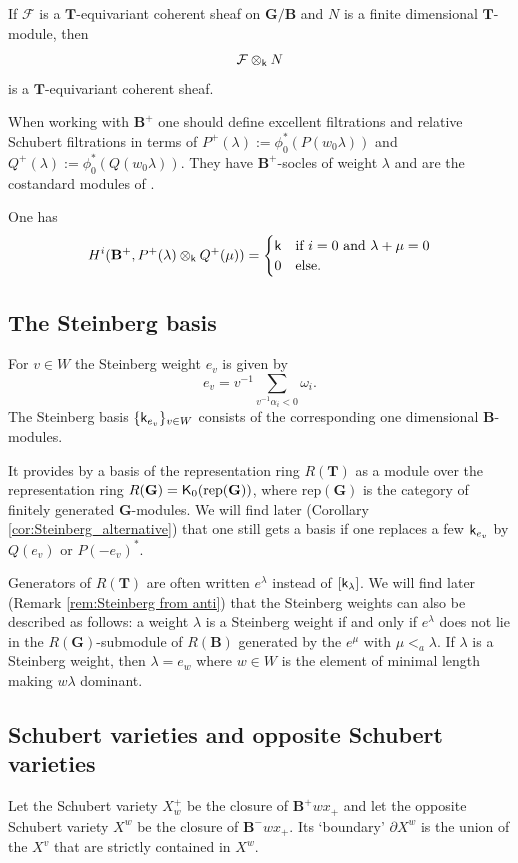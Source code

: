 \documentclass[sn-mathphys-num]{sn-jnl}%
\newcommand\F{{\mathcal F}}
\newcommand{\rep}{{\mathrm{rep}}}
\newcommand{\sk}{{\sf k}}
\newcommand{\sK}{{\sf K}}
\newcommand{\bg}{\mathbf G}
\newcommand{\fb}{\mathbf B}
\newcommand{\bt}{\mathbf T}
\newcommand{\fX}{{ X}}
\def\text#1{\mbox{#1}}
\theoremstyle{definition}
\begin{document}
If $\F$ is a $ \bt$-equivariant coherent sheaf on $ \bg / \fb$ and $N$ is a finite dimensional $ \bt$-module, then
$$\F\otimes_\sk N$$ is a $ \bt$-equivariant coherent sheaf.

When working with $ \fb^+$ one should define excellent filtrations and relative Schubert filtrations in terms
of $P^+(\lambda):=\phi_0^* (P(w_0\lambda))$ and
$Q^+(\lambda):= \phi_0^* (Q(w_0\lambda))$. They have $ \fb^+$-socles of weight $\lambda$ and are the costandard
modules of \cite{WvdK}.

One has 
 $$H^i( \fb^+,P^+(\lambda)\otimes_\sk Q^+(\mu))=
\begin{cases}\sk &\text{if $i=0$ and $\lambda+\mu=0$}\\
0&\text{else.}
\end{cases}
$$

\subsection{The Steinberg basis}\label{subsec:Steinberg}

For $v\in W$ the Steinberg weight $e_v$ is given by $$e_v = v^{-1} \sum_{v^{-1}\alpha_i<0} \omega_i.$$
The Steinberg basis $\{\sk_{e_v}\}_{v\in W}$ consists of the corresponding one dimensional
$\fb$-modules.

It provides by \cite{St} a basis of the representation ring $R( \bt)$ as a module over the representation ring $R( \bg )=\sK_0(\rep( \bg ))$,
where $\rep( \bg )$ is the category of finitely generated $ \bg $-modules.
We will find later (Corollary \ref{cor:Steinberg_alternative}) that one still gets a basis if one replaces a few $\sk_{e_v}$ by $Q(e_v)$ or $P(-e_v)^*$.

Generators of $R( \bt)$ are often written $e^\lambda$ instead of $[\sk_\lambda]$.
We will find later (Remark \ref{rem:Steinberg from anti}) that the Steinberg weights can also be described as follows: a weight $\lambda$ is a Steinberg weight if and only if $e^\lambda$ does not lie in the $R(\bg)$-submodule of $R(\fb)$
generated by the $e^\mu$ with $\mu<_a\lambda$.
 If $\lambda$ is a Steinberg weight, then $\lambda=e_w$ where $w\in W$ is the element of minimal length making $w\lambda$ dominant.

\subsection{Schubert varieties and opposite Schubert varieties}
\label{subsec:alphabet}
Let the Schubert variety $\fX^+_w$ be the closure of $ \fb^+wx_+$ and let the opposite Schubert variety
$\fX^w$ be the closure of 
$ \fb^-wx_+$. Its `boundary' $\partial \fX^w$ is the union of the $\fX^v$ that are strictly contained in $\fX^w$.
\end{document}
